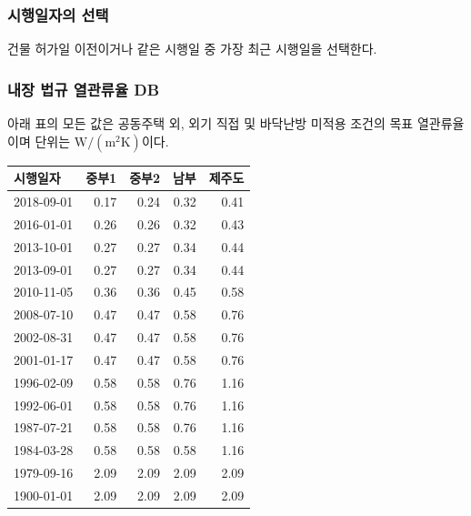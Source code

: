 \subsubsection{시행일자의 선택}

건물 허가일 이전이거나 같은 시행일 중 가장 최근 시행일을 선택한다.

\subsubsection{내장 법규 열관류율 DB}

아래 표의 모든 값은 공동주택 외, 외기 직접 및 바닥난방 미적용 조건의 목표 열관류율이며 단위는
$\mathrm{W/(m^2K)}$이다.

\begin{defaulttable}
  \caption{\texttt{@vintage\_regulation} 외벽에 적용되는 열관류율
    $[\mathrm{W/(m^2K)}]$}
  \label{tbl:unknown-db-wall}
  {\small
  \renewcommand{\arraystretch}{1.05}
  \begin{tabular}{lrrrr}
    \toprule
    시행일자 & 중부1 & 중부2 & 남부 & 제주도 \\ \midrule
    2018-09-01 & 0.17 & 0.24 & 0.32 & 0.41 \\
    2016-01-01 & 0.26 & 0.26 & 0.32 & 0.43 \\
    2013-10-01 & 0.27 & 0.27 & 0.34 & 0.44 \\
    2013-09-01 & 0.27 & 0.27 & 0.34 & 0.44 \\
    2010-11-05 & 0.36 & 0.36 & 0.45 & 0.58 \\
    2008-07-10 & 0.47 & 0.47 & 0.58 & 0.76 \\
    2002-08-31 & 0.47 & 0.47 & 0.58 & 0.76 \\
    2001-01-17 & 0.47 & 0.47 & 0.58 & 0.76 \\
    1996-02-09 & 0.58 & 0.58 & 0.76 & 1.16 \\
    1992-06-01 & 0.58 & 0.58 & 0.76 & 1.16 \\
    1987-07-21 & 0.58 & 0.58 & 0.76 & 1.16 \\
    1984-03-28 & 0.58 & 0.58 & 0.58 & 1.16 \\
    1979-09-16 & 2.09 & 2.09 & 2.09 & 2.09 \\
    1900-01-01 & 2.09 & 2.09 & 2.09 & 2.09 \\
    \bottomrule
  \end{tabular}
  }
\end{defaulttable}

